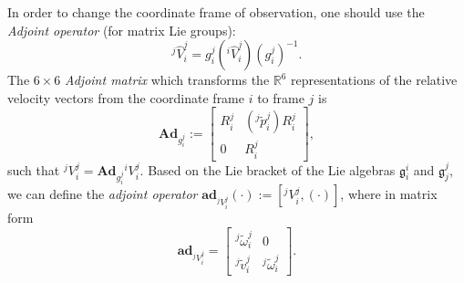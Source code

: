 \documentclass[lettersize,journal]{IEEEtran}
\def \SE {\textbf{SE}(3)}
\def \R  {\mathbb{R}}
\def \g  {\mathfrak{g}}
\def \Ad {\textbf{Ad}}
\begin{document}
In order to change the coordinate frame of observation, one should use the \textit{Adjoint operator} (for matrix Lie groups):
\begin{equation*}
    ^j\hat{V}_i^j={g^j_i}{}(^i\hat{V}_i^ j)({g^j_i})^{-1}.
\end{equation*}
The $6 \times 6$ \textit{Adjoint matrix} which transforms the $\R^6$ representations of the relative velocity vectors from the coordinate frame $i$ to frame $j$ is 
\begin{equation}
    \Ad_{g_i^ j}:=\begin{bmatrix}R_i^ j & (^ j\tilde{p}_i^ j) R_i^ j \\0& R_i^ j\end{bmatrix},
\end{equation}
such that $^j{V}_i^j=\Ad_{g^j_i}{}^i{V}_i^j$. Based on the Lie bracket of the Lie algebras $\g^i_i$ and $\g^j_j$, we can define the \textit{adjoint operator} $\textbf{ad}_{{}^jV^j_i}(\cdot):=[{^jV^j_i},(\cdot)]$,
where in matrix form
\begin{equation}
\textbf{ad}_{{}^jV^j_i}=\begin{bmatrix}^j\tilde{\omega}_i^{j} & 0\\^j\tilde{v}_i^{j} & ^j\tilde{\omega}_i^{j}\end{bmatrix}.
\label{adjlow}
\end{equation}
\end{document}
